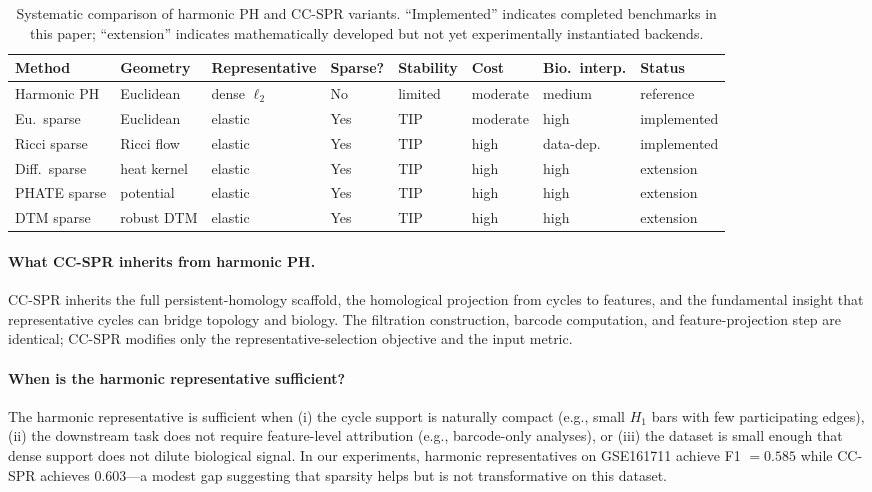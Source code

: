 \documentclass[11pt]{article}
\begin{document}
\begin{table}[h]
\centering
\small
\begin{tabular}{p{2.0cm}p{1.6cm}p{1.5cm}p{1.1cm}p{1.3cm}p{1.3cm}p{1.2cm}p{1.5cm}}
\toprule
Method & Geometry & Representative & Sparse? & Stability & Cost & Bio.\ interp. & Status \\
\midrule
Harmonic PH & Euclidean & dense $\ell_2$ & No & limited & moderate & medium & reference \\
Eu.\ sparse & Euclidean & elastic & Yes & TIP & moderate & high & implemented \\
Ricci sparse & Ricci flow & elastic & Yes & TIP & high & data-dep. & implemented \\
Diff.\ sparse & heat kernel & elastic & Yes & TIP & high & high & extension \\
PHATE sparse & potential & elastic & Yes & TIP & high & high & extension \\
DTM sparse & robust DTM & elastic & Yes & TIP & high & high & extension \\
\bottomrule
\end{tabular}
\caption{Systematic comparison of harmonic PH and CC-SPR variants. ``Implemented'' indicates completed benchmarks in this paper; ``extension'' indicates mathematically developed but not yet experimentally instantiated backends.}
\label{tab:hphcompare}
\end{table}

\paragraph{What CC-SPR inherits from harmonic PH.}
CC-SPR inherits the full persistent-homology scaffold, the homological projection from cycles to features, and the fundamental insight that representative cycles can bridge topology and biology.
The filtration construction, barcode computation, and feature-projection step are identical; CC-SPR modifies only the representative-selection objective and the input metric.

\paragraph{When is the harmonic representative sufficient?}
The harmonic representative is sufficient when (i) the cycle support is naturally compact (e.g., small $H_1$ bars with few participating edges), (ii) the downstream task does not require feature-level attribution (e.g., barcode-only analyses), or (iii) the dataset is small enough that dense support does not dilute biological signal.
In our experiments, harmonic representatives on GSE161711 achieve F1 $= 0.585$ while CC-SPR achieves $0.603$---a modest gap suggesting that sparsity helps but is not transformative on this dataset.
\end{document}
